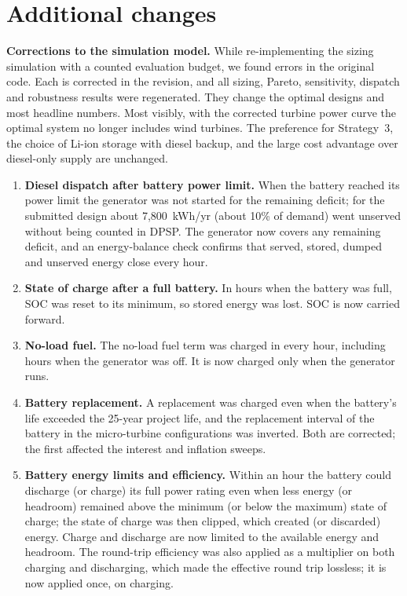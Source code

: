 \documentclass[11pt]{article}
\begin{document}
\section*{Additional changes}
\textbf{Corrections to the simulation model.} While re-implementing the sizing simulation with a counted evaluation budget, we found errors in the original code. Each is corrected in the revision, and all sizing, Pareto, sensitivity, dispatch and robustness results were regenerated. They change the optimal designs and most headline numbers. Most visibly, with the corrected turbine power curve the optimal system no longer includes wind turbines. The preference for Strategy~3, the choice of Li-ion storage with diesel backup, and the large cost advantage over diesel-only supply are unchanged.
\begin{enumerate}[leftmargin=*,itemsep=1pt]
\item \textbf{Diesel dispatch after battery power limit.} When the battery reached its power limit the generator was not started for the remaining deficit; for the submitted design about 7,800~kWh/yr (about 10\% of demand) went unserved without being counted in DPSP. The generator now covers any remaining deficit, and an energy-balance check confirms that served, stored, dumped and unserved energy close every hour.
\item \textbf{State of charge after a full battery.} In hours when the battery was full, SOC was reset to its minimum, so stored energy was lost. SOC is now carried forward.
\item \textbf{No-load fuel.} The no-load fuel term was charged in every hour, including hours when the generator was off. It is now charged only when the generator runs.
\item \textbf{Battery replacement.} A replacement was charged even when the battery's life exceeded the 25-year project life, and the replacement interval of the battery in the micro-turbine configurations was inverted. Both are corrected; the first affected the interest and inflation sweeps.
\item \textbf{Battery energy limits and efficiency.} Within an hour the battery could discharge (or charge) its full power rating even when less energy (or headroom) remained above the minimum (or below the maximum) state of charge; the state of charge was then clipped, which created (or discarded) energy. Charge and discharge are now limited to the available energy and headroom. The round-trip efficiency was also applied as a multiplier on both charging and discharging, which made the effective round trip lossless; it is now applied once, on charging.

\end{enumerate}
\end{document}
